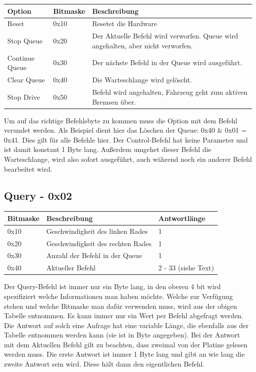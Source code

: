 \documentclass[a4paper]{article}
\begin{document}
	\begin{tabularx}{\linewidth}{|l|l|X|}
		\hline
		\textbf{Option} & \textbf{Bitmaske} & \textbf{Beschreibung} \\
		\hline
		\hline
		Reset 			& 0x10 				& Resetet die Hardware \\
		\hline
		Stop Queue		& 0x20				& Der Aktuelle Befehl wird verworfen. Queue wird angehalten, aber nicht verworfen. \\
		\hline
		Continue Queue	& 0x30				& Der nächste Befehl in der Queue wird ausgeführt. \\
		\hline
		Clear Queue		& 0x40				& Die Warteschlange wird gelöscht. \\
		\hline
		Stop Drive		& 0x50				& Befehl wird angehalten, Fahrzeug geht zum aktiven Bremsen über. \\
		\hline
	\end{tabularx}

	Um auf das richtige Befehlsbyte zu kommen muss die Option mit dem Befehl verundet werden. Als Beispiel dient hier das Löschen
	der Queue: 0x40 \& 0x01 = 0x41. Dies gilt für alle Befehle hier.
	Der Control-Befehl hat keine Parameter und ist damit konstant 1 Byte lang. Außerdem umgehet dieser Befehl die Warteschlange,
	wird also sofort ausgeführt, auch während noch ein anderer Befehl bearbeitet wird.

	\subsection{Query - 0x02}

	\begin{tabularx}{\linewidth}{|l|l|X|}
		\hline
		\textbf{Bitmaske} & \textbf{Beschreibung} & \textbf{Antwortlänge} \\
		\hline
		\hline
		0x10 				& Geschwindigkeit des linken Rades & 1 \\
		\hline
		0x20				& Geschwindigkeit des rechten Rades & 1 \\
		\hline
		0x30				& Anzahl der Befehl in der Queue & 1 \\
		\hline
		0x40				& Aktueller Befehl & 2 - 33 (siehe Text) \\
		\hline
	\end{tabularx}
	
	Der Query-Befehl ist immer nur ein Byte lang, in den oberen 4 bit wird spezifiziert welche Informationen man haben möchte.
	Welche zur Verfügung stehen und welche Bitmaske man dafür verwenden muss, wird aus der obigen Tabelle entnommen. Es kann immer
	nur ein Wert per Befehl abgefragt werden. Die Antwort auf solch eine Anfrage hat eine variable Länge, die ebenfalls aus
	der Tabelle entnommen werden kann (sie ist in Byte angegeben).
	Bei der Antwort mit dem Aktuellen Befehl gilt zu beachten, dass zweimal von der Platine gelesen werden muss. Die erste
	Antwort ist immer 1 Byte lang und gibt an wie lang die zweite Antwort sein wird. Diese hält dann den eigentlichen Befehl.
\end{document}
